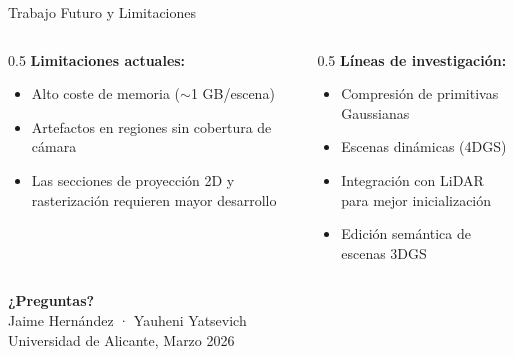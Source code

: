 \begin{frame}{Trabajo Futuro y Limitaciones}
  \begin{columns}
    \begin{column}{0.5\textwidth}
      \textbf{Limitaciones actuales:}
      \begin{itemize}
        \item Alto coste de memoria ($\sim$1 GB/escena)
        \item Artefactos en regiones sin cobertura de cámara
        \item Las secciones de proyección 2D y rasterización requieren mayor desarrollo
      \end{itemize}
    \end{column}
    \begin{column}{0.5\textwidth}
      \textbf{Líneas de investigación:}
      \begin{itemize}
        \item Compresión de primitivas Gaussianas
        \item Escenas dinámicas (4DGS)
        \item Integración con LiDAR para mejor inicialización
        \item Edición semántica de escenas 3DGS
      \end{itemize}
    \end{column}
  \end{columns}
\end{frame}

\begin{frame}[standout]
  \centering
  \LARGE \textbf{¿Preguntas?}\\[1em]
  \normalsize
  Jaime Hernández · Yauheni Yatsevich\\
  Universidad de Alicante, Marzo 2026
\end{frame}
